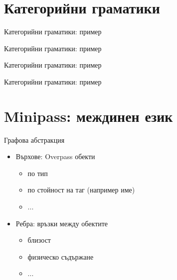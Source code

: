 \documentclass[10pt]{beamer}
\begin{document}
  \section{Категорийни граматики}
  \begin{frame}{Категорийни граматики: пример}
  \end{frame}
  \begin{frame}{Категорийни граматики: пример}
  \end{frame}
  \begin{frame}{Категорийни граматики: пример}
  \end{frame}
  \begin{frame}{Категорийни граматики: пример}
  \end{frame}

  \section{Minipass: междинен език}
  \begin{frame}{Графова абстракция}
    \begin{itemize}
      \item Върхове: Overpass обекти
        \begin{itemize}
          \item по тип
          \item по стойност на таг (например име)
          \item ...
        \end{itemize}
      \item Ребра: връзки между обектите \pika
        \begin{itemize}
          \item близост
          \item физическо съдържане
          \item ...
        \end{itemize}
    \end{itemize}
  \end{frame}
\end{document}

